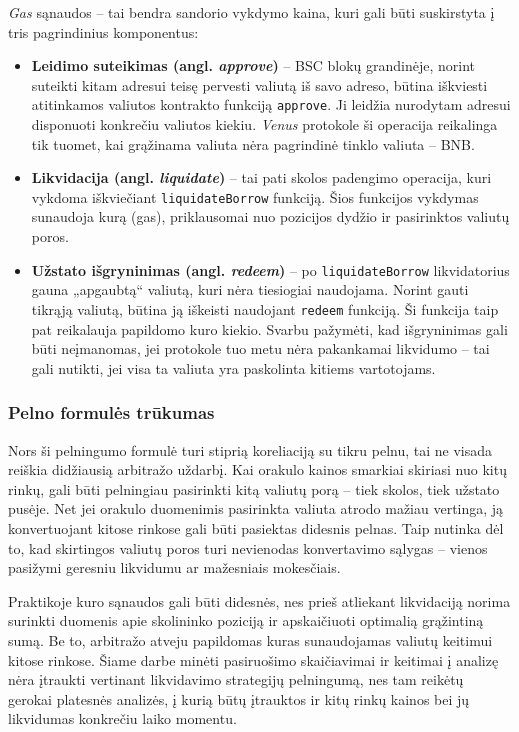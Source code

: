 \documentclass[]{VUMIFTemplateClass}
\begin{document}
\textit{Gas} sąnaudos – tai bendra sandorio vykdymo kaina, kuri gali būti suskirstyta į tris pagrindinius komponentus:
\begin{itemize}
    \item \textbf{Leidimo suteikimas (angl. \textit{approve})} – BSC blokų grandinėje, norint suteikti kitam adresui teisę pervesti valiutą iš savo adreso, būtina iškviesti atitinkamos valiutos kontrakto funkciją \texttt{approve}. Ji leidžia nurodytam adresui disponuoti konkrečiu valiutos kiekiu. \textit{Venus} protokole ši operacija reikalinga tik tuomet, kai grąžinama valiuta nėra pagrindinė tinklo valiuta – BNB.
  
    \item \textbf{Likvidacija (angl. \textit{liquidate})} – tai pati skolos padengimo operacija, kuri vykdoma iškviečiant \texttt{liquidateBorrow} funkciją. Šios funkcijos vykdymas sunaudoja kurą (gas), priklausomai nuo pozicijos dydžio ir pasirinktos valiutų poros.
  
    \item \textbf{Užstato išgryninimas (angl. \textit{redeem})} – po \texttt{liquidateBorrow} likvidatorius gauna „apgaubtą“ valiutą, kuri nėra tiesiogiai naudojama. Norint gauti tikrąją valiutą, būtina ją iškeisti naudojant \texttt{redeem} funkciją. Ši funkcija taip pat reikalauja papildomo kuro kiekio. Svarbu pažymėti, kad išgryninimas gali būti neįmanomas, jei protokole tuo metu nėra pakankamai likvidumo – tai gali nutikti, jei visa ta valiuta yra paskolinta kitiems vartotojams.
\end{itemize}

\subsubsection{Pelno formulės trūkumas}

Nors ši pelningumo formulė turi stiprią koreliaciją su tikru pelnu, tai ne visada reiškia didžiausią arbitražo uždarbį. Kai orakulo kainos smarkiai skiriasi nuo kitų rinkų, gali būti pelningiau pasirinkti kitą valiutų porą – tiek skolos, tiek užstato pusėje. Net jei orakulo duomenimis pasirinkta valiuta atrodo mažiau vertinga, ją konvertuojant kitose rinkose gali būti pasiektas didesnis pelnas. Taip nutinka dėl to, kad skirtingos valiutų poros turi nevienodas konvertavimo sąlygas – vienos pasižymi geresniu likvidumu ar mažesniais mokesčiais.

Praktikoje kuro sąnaudos gali būti didesnės, nes prieš atliekant likvidaciją norima surinkti duomenis apie skolininko poziciją ir apskaičiuoti optimalią grąžintiną sumą. Be to, arbitražo atveju papildomas kuras sunaudojamas valiutų keitimui kitose rinkose. Šiame darbe minėti pasiruošimo skaičiavimai ir keitimai į analizę nėra įtraukti vertinant likvidavimo strategijų pelningumą, nes tam reikėtų gerokai platesnės analizės, į kurią būtų įtrauktos ir kitų rinkų kainos bei jų likvidumas konkrečiu laiko momentu.
\end{document}
